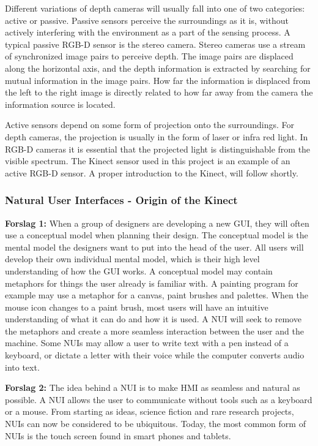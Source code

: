 Different variations of depth cameras will usually fall into one of two categories: active or passive. Passive sensors perceive the surroundings as it is, without actively interfering with the environment as a part of the sensing process. A typical passive RGB-D sensor is the stereo camera. Stereo cameras use a stream of synchronized image pairs to perceive depth. The image pairs are displaced along the horizontal axis, and the depth information is extracted by searching for mutual information in the image pairs. How far the information is displaced from the left to the right image is directly related to how far away from the camera the information source is located. 

Active sensors depend on some form of projection onto the surroundings. For depth cameras, the projection is usually in the form of laser or infra red light. In RGB-D cameras it is essential that the projected light is distinguishable from the visible spectrum. The Kinect sensor used in this project is an example of an active RGB-D sensor. A proper introduction to the Kinect, will follow shortly.

\subsubsection{Natural User Interfaces - Origin of the Kinect}

\textbf{Forslag 1:}
When a group of designers are developing a new \ac{GUI}, they will often use a conceptual model when planning their design. The conceptual model is the mental model the designers want to put into the head of the user. All users will develop their own individual mental model, which is their high level understanding of how the \ac{GUI} works. A conceptual model may contain metaphors for things  the user already is familiar with. A painting program for example may use a metaphor for a canvas, paint brushes and palettes. When the mouse icon changes to a paint brush, most users will have an intuitive understanding of what it can do and how it is used. A \ac{NUI} will seek to remove the metaphors and create a more seamless interaction between the user and the machine. Some \ac{NUI}s may allow a user to write text with a pen instead of a keyboard, or dictate a letter with their voice while the computer converts audio into text. 

\textbf{Forslag 2:}
The idea behind a \ac{NUI} is to make \ac{HMI} as seamless and natural as possible. A \ac{NUI} allows the user to communicate without tools such as a keyboard or a mouse. From starting as ideas, science fiction and rare research projects, \ac{NUI}s can now be considered to be ubiquitous. Today, the most common form of \ac{NUI}s is the touch screen found in smart phones and tablets. 

